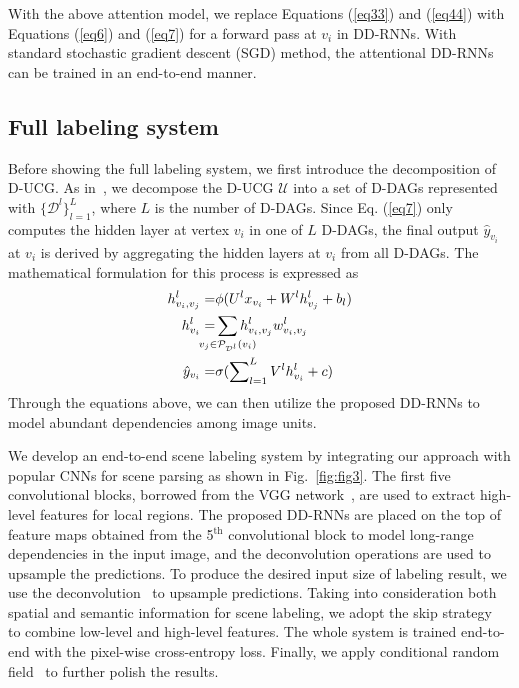 \documentclass[10pt,twocolumn,letterpaper]{article}
\newcommand{\HL}[1]{\textcolor[rgb]{0.00,0.00,0.00}{#1}}
\begin{document}
With the above attention model, we replace Equations (\ref{eq33}) and (\ref{eq44}) with Equations (\ref{eq6}) and (\ref{eq7}) for a forward pass at $v_i$ in DD-RNNs. With standard stochastic gradient descent (SGD) method, the attentional DD-RNNs can be trained in an end-to-end manner.

\subsection{Full labeling system}
\label{sec33}

Before showing the full labeling system, we first introduce the decomposition of D-UCG. As in~\cite{shuai2017scene}, we decompose the D-UCG $\mathcal{U}$ into a set of D-DAGs represented with $\{\mathcal{D}^{l}\}_{l=1}^L$, where $L$ is the number of D-DAGs. Since Eq. (\ref{eq7}) only computes the hidden layer at vertex $v_i$ in one of $L$ D-DAGs, the final output $\hat{y}_{v_i}$ at $v_i$ is derived by aggregating the hidden layers at $v_i$ from all D-DAGs. The mathematical formulation for this process is expressed as
\begin{align}
h_{v_i,v_j}^{l} = &\phi(U^{l}x_{v_i}+W^{l}h_{v_j}^{l}+b_l) \label{eq12} \\
h_{v_i}^{l} = &\sum\limits_{\mathclap{v_j\in{\mathcal{P}_{\mathcal{D}^{l}}(v_i)}}}{h_{v_i,v_j}^{l}w_{v_i,v_j}^{l}} \label{eq13}\\
\hat{y}_{v_i} = &\sigma(\sum\nolimits_{l=1}^{L}V^{l}h_{v_i}^{l}+c) \label{eq14}
\end{align}
Through the equations above, we can then utilize the proposed DD-RNNs to model abundant dependencies among image units.

We develop an end-to-end scene labeling system by integrating our approach with popular CNNs for scene parsing as shown in Fig.~\ref{fig:fig3}. The first five convolutional blocks, borrowed from the VGG network~\cite{simonyan2014very}, are used to extract high-level features for local regions. The proposed DD-RNNs are placed on the top of feature maps obtained from the 5$^{\mathrm{th}}$ convolutional block to model long-range dependencies in the input image, and the deconvolution operations are used to upsample the predictions. To produce the desired input size of labeling result, we use the deconvolution~\cite{zeiler2011adaptive} to upsample predictions. Taking into consideration both spatial and semantic information for scene labeling, we adopt the skip strategy~\cite{long2015fully} to combine low-level and high-level features. The whole system is trained end-to-end with the pixel-wise cross-entropy loss. \HL{Finally, we apply conditional random field~\cite{krahenbuhl2011efficient} to further polish the results.}
\end{document}
